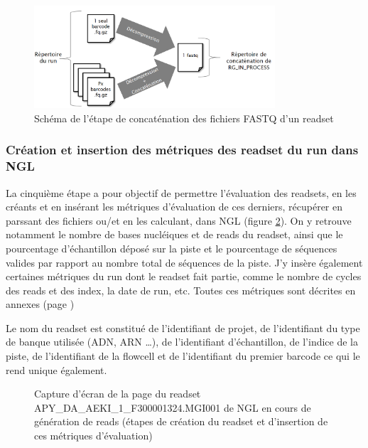 \begin{figure}[H]
    \centering
    \includegraphics[width=0.8\textwidth]{img/Schéma_concaténation.png}
    \caption{\footnotesize{Schéma de l'étape de \og concaténation\fg{} des fichiers FASTQ d'un readset}}
    \label{schema-concat-fastq}
\end{figure}

\subsubsection*{Création et insertion des métriques des readset du run dans NGL}
La cinquième étape a pour objectif de permettre l'évaluation des readsets, en les créants et en insérant les métriques d'évaluation de ces derniers, récupérer en parssant des fichiers ou/et en les calculant, dans NGL (figure \ref{NGL-screenshot_readset}).
On y retrouve notamment le nombre de bases nucléiques et de reads du readset, ainsi que le pourcentage d'échantillon déposé sur la piste et le pourcentage de séquences valides par rapport au nombre total de séquences de la piste.
J'y insère également certaines métriques du run dont le readset fait partie, comme le nombre de cycles des reads et des index, la date de run, etc. Toutes ces métriques sont décrites en annexes (page \pageref{anexes3})

Le nom du readset est constitué de l'identifiant de projet, de l'identifiant du type de banque utilisée (ADN, ARN \dots), de l'identifiant d'échantillon, de l'indice de la piste, de l'identifiant de la flowcell et de l'identifiant du premier barcode ce qui le rend unique également.

\begin{figure}[H]
    \centering
    \caption{\footnotesize{Capture d'écran de la page du readset APY\_DA\_AEKI\_1\_F300001324.MGI001 de NGL en cours de génération de reads (étapes de création du readset et d'insertion de ces métriques d'évaluation)}}
    \label{NGL-screenshot_readset}
\end{figure}

